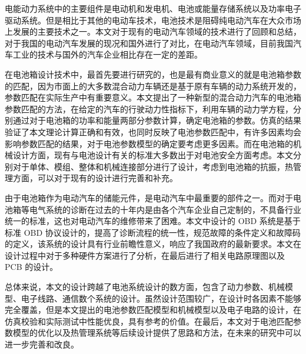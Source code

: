 

\begin{conclusion}

电能动力系统中的主要组件是电动机和发电机、电池或能量存储系统以及功率电子驱动系统。但是相比于其他的电动车技术，电池技术是阻碍纯电动汽车在大众市场上发展的主要技术之一。本文对于现有的电动汽车领域的技术进行了回顾和总结，对于我国的电动汽车发展的现况和国外进行了对比，在电动汽车领域，目前我国汽车工业的技术与国外的汽车企业相比存在一定的差距。

在电池箱设计技术中，最首先要进行研究的，也是最有商业意义的就是电池箱参数的匹配，因为市面上的大多数混合动力车辆还是基于原有车辆的动力系统开发的，参数匹配在实际生产中有重要意义。本文提出了一种新型的混合动力汽车的电池箱参数匹配的方法，在给定的汽车的行驶动力性指标下，利用车辆的动力学方程，分别通过对于电池箱的功率和能量两部分参数计算，确定电池箱的参数。仿真的结果验证了本文理论计算正确和有效，也同时反映了电池参数匹配中，有许多因素均会影响参数匹配的结果，对于电池参数模型的确定要考虑更多因素。而在电池箱的机械设计方面，现有与电池设计有关的标准大多数出于对电池安全方面考虑。本文分别对于单体、模组、整体和机械连接部分进行了设计，考虑到电池箱的抗振，热管理方面，可以对于现有的设计进行完善和补充。

由于电池箱作为电动汽车的储能元件，是电动汽车中最重要的部件之一。而对于电池箱等电气系统的诊断在过去的十年内是由各个汽车企业自己定制的，不具备行业统一的标准，这也对电动汽车的维修带来了困难。本文中设计的 OBD 系统是基于标准 OBD 协议设计的，提高了诊断流程的统一性，规范故障的条件定义和故障码的定义，该系统的设计具有行业前瞻性意义，响应了我国政府的最新要求。本文在设计过程中对于多种硬件方案进行了分析，在最后进行了相关电路原理图以及 PCB 的设计。

总体来说，本文的设计跨越了电池系统设计的数方面，包含了动力参数、机械模型、电子线路、通信数个系统的设计。虽然设计范围较广，在设计时各因素不能够完全覆盖，但是本文提出的电池参数匹配模型和机械模型以及电子电路的设计，在仿真校验和实际测试中性能优良，具有参考的价值。在最后，本文对于电池匹配参数模型的优化以及热管理系统等后续设计提供了思路和方法，在未来的研究中可以进一步完善和改良。

\end{conclusion}
